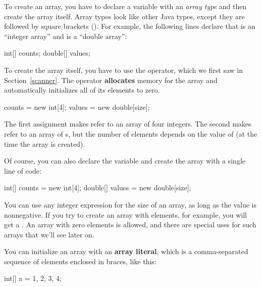 
To create an array, you have to declare a variable with an {\em array type} and then create the array itself.
Array types look like other Java types, except they are followed by square brackets (\java{[]}).
For example, the following lines declare that  is an ``integer array'' and  is a ``double array'':

\begin{code}
int[] counts;
double[] values;
\end{code}


To create the array itself, you have to use the  operator, which we first saw in Section~\ref{scanner}.
The  operator {\bf allocates} memory for the array and automatically initializes all of its elements to zero.

\begin{code}
counts = new int[4];
values = new double[size];
\end{code}

The first assignment makes  refer to an array of four integers.
The second makes  refer to an array of s, but the number of elements depends on the value of  (at the time the array is created).

Of course, you can also declare the variable and create the array with a single line of code:

\begin{code}
int[] counts = new int[4];
double[] values = new double[size];
\end{code}


You can use any integer expression for the size of an array, as long as the value is nonnegative.
If you try to create an array with  elements, for example, you will get a .
An array with zero elements is allowed, and there are special uses for such arrays that we'll see later on.

You can initialize an array with an {\bf array literal}, which is a comma-separated sequence of elements enclosed in braces, like this:

\begin{code}
int[] a = {1, 2, 3, 4};
\end{code}

